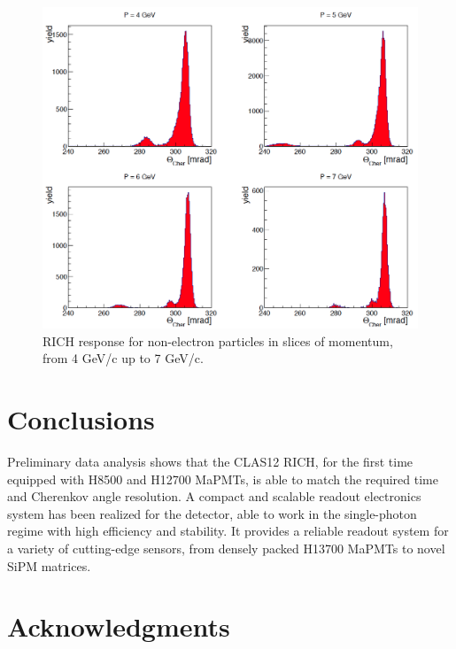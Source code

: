 \documentclass[5p,times,twocolumn]{elsarticle}
\begin{document}
\begin{figure}[t]
\begin{center}
\includegraphics[width=1.0\columnwidth]{Pslices.png}
\end{center}
\caption{RICH response for non-electron particles in slices of momentum, from 4 GeV/c up to 7 GeV/c.}
\label{Fig:CHhad}
\end{figure}

\section{Conclusions}

Preliminary data analysis shows that the CLAS12 RICH, for the first time equipped with H8500 and H12700 MaPMTs, is able to match the required time and Cherenkov angle resolution. A compact and scalable readout electronics system has been realized for the detector, able to work in the single-photon regime with high efficiency and stability.
It provides a reliable readout system for a variety of cutting-edge sensors, from densely packed H13700 MaPMTs to novel SiPM matrices.

\section{Acknowledgments}
\end{document}
